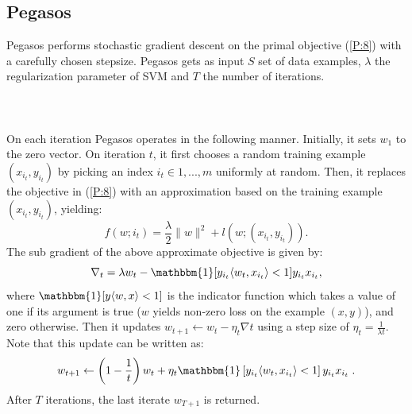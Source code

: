 \documentclass[12pt]{article}
\begin{document}
\subsection{Pegasos}
Pegasos performs stochastic gradient descent on the primal
objective (\ref{P:8}) with a carefully chosen stepsize. Pegasos gets as input $S$ set of data examples, $\lambda$ the regularization parameter of SVM and $T$ the number of iterations.\\
\\\\
\\On each iteration Pegasos operates in the following manner. Initially, it sets $w_1$ to the zero vector. On iteration $t$, it first chooses a random training example
$(x_{i_t},y_{i_t})$ by picking an index $i_t \in {1, . . . , m}$ uniformly at random. Then, it replaces the objective in (\ref{P:8}) with an approximation based on the training example $(x_{i_t} , y_{i_t})$, yielding:
$$f(w;i_t) = \frac{\lambda}{2}\|w\|^2 + l(w; (x_{i_t} , y_{i_t})). $$
The sub gradient of the above approximate objective is given by:
$$ \nabla_t = \lambda w_t - \mathbbm{1} [y_{i_t} \langle w_t, x_{i_t} \rangle < 1] y_{i_t}x_{i_t},$$
where $\mathbbm{1} [y\langle w, x \rangle < 1]$ is the indicator function which takes a value of one if its argument is true ($w$ yields non-zero loss on the example $(x, y)$), and zero otherwise. Then it updates $w_{t+1} \leftarrow w_t - \eta_t\nabla t $ using a step size of $\eta_t = \frac{1}{\lambda t}$. Note that this update can be written as:
$$w_{t+1} \leftarrow \left(1 - \frac{1}{t} \right)w_t + \eta_t \mathbbm{1}\left[y_{i_t} \langle w_t, x_{i_t} \rangle < 1\right] y_{i_t}x_{i_t}\; .$$
After $T$ iterations, the last iterate $w_{T +1}$ is returned.
\end{document}
